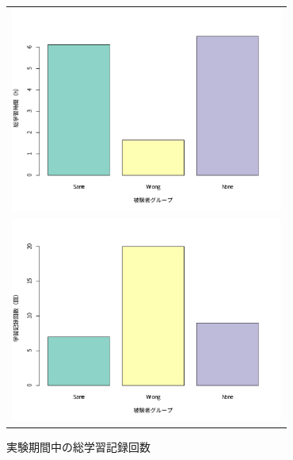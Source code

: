 \begin{figure}[htb]
\begin{center}
\begin{tabular}{c}

\begin{minipage}[htb]{\linewidth}
  \begin{center}
  \includegraphics[width=9cm]{images/7/total_study_time.pdf}
  \caption{実験期間中の総学習時間}
  \label{fig:total_study_time}
  \end{center}
\end{minipage}

\\

\begin{minipage}[htb]{\linewidth}
  \begin{center}
  \includegraphics[width=9cm]{images/7/total_study_count.pdf}
  \caption{実験期間中の総学習記録回数}
  \label{fig:total_study_count}
  \end{center}
\end{minipage}

\\


\end{tabular}
\end{center}
\end{figure}
